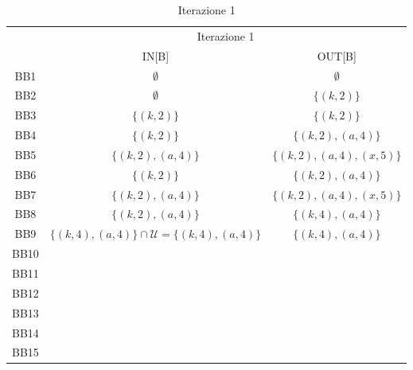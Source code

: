\documentclass[10pt,a4paper]{article}
\begin{document}
\begin{table}[h!]
\centering
\renewcommand{\arraystretch}{1.2}
\begin{tabular}{|c|c|c|}
\hline
\rowcolor{blue!30}
 & \multicolumn{2}{c|}{Iterazione 1} \\
\rowcolor{blue!30}
 & IN[B] & OUT[B] \\
\hline
BB1 & $\emptyset$ & $\emptyset$ \\
\hline
BB2 & $\emptyset$ & $\lbrace(k,2)\rbrace$ \\
\hline
BB3 & $\lbrace(k,2)\rbrace$ & $\lbrace(k,2)\rbrace$ \\
\hline
BB4 & $\lbrace(k,2)\rbrace$ & $\lbrace(k,2),(a,4)\rbrace$ \\
\hline
BB5 & $\lbrace(k,2),(a,4)\rbrace$ & $\lbrace(k,2),(a,4),(x,5)\rbrace$ \\
\hline
BB6 & $\lbrace(k,2)\rbrace$ & $\lbrace(k,2),(a,4)\rbrace$ \\
\hline
BB7 & $\lbrace(k,2),(a,4)\rbrace$ & $\lbrace(k,2),(a,4),(x,5)\rbrace$ \\
\hline
BB8 & $\lbrace(k,2),(a,4)\rbrace$ & $\lbrace(k,4),(a,4)\rbrace$ \\
\hline
BB9 & $\lbrace(k,4),(a,4)\rbrace\cap\mathcal{U}=\lbrace(k,4),(a,4)\rbrace$ & $\lbrace(k,4),(a,4)\rbrace$ \\
\hline
BB10 & & \\
\hline
BB11 & & \\
\hline
BB12 & & \\
\hline
BB13 & & \\
\hline
BB14 & & \\
\hline
BB15 & & \\
\hline
\end{tabular}
\caption{Iterazione 1}
\end{table}
\end{document}
